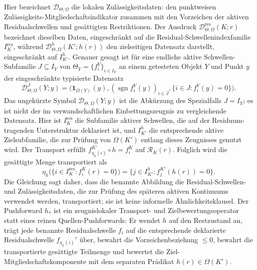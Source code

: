 Hier bezeichnet \(\mathcal{D}_{\Theta,\Omega}\) die lokalen Zulässigkeitsdaten: den punktweisen
Zulässigkeits-Mitgliedschaftsindikator zusammen mit den Vorzeichen der aktiven Residualschwellen und
gesättigten Restriktionen. Der Ausdruck
\(\mathcal{D}^{\mathrm{res}}_{\Theta,\Omega}(K;r)\) bezeichnet dieselben Daten, eingeschränkt auf die
Residual-Schwellenindexfamilie \(I_K^{\mathrm{res}}\), während
\(\mathcal{D}^{h}_{\Theta,\Omega}(K';h(r))\) den zielseitigen Datensatz darstellt, eingeschränkt auf
\(I_{K'}^{h}\). Genauer gesagt ist für eine endliche aktive Schwellen-Subfamilie
\(J\subseteq I_Y\) von
\(\Theta_Y=\{f_i^Y\}_{i\in I_Y}\) an einem getesteten Objekt \(Y\) und Punkt \(y\) der eingeschränkte
typisierte Datensatz
\[
  \mathcal{D}^{J}_{\Theta,\Omega}(Y;y)=
  \big(
    \mathbf{1}_{\Omega(Y)}(y),
    (\operatorname{sgn} f_i^Y(y))_{i\in J},
    \{i\in J:f_i^Y(y)=0\}
  \big).
\]
Das ungekürzte Symbol \(\mathcal{D}_{\Theta,\Omega}(Y;y)\) ist die Abkürzung des Spezialfalls
\(J=I_Y\); es ist nicht der im verwandschaftlichen Einbettungszeugnis zu vergleichende Datensatz.
Hier ist \(I_K^{\mathrm{res}}\) die Subfamilie aktiver Schwellen, die auf der Residuum-tragenden
Unterstruktur deklariert ist, und \(I_{K'}^{h}\) die entsprechende aktive Zielsubfamilie, die zur Prüfung von
\(\Omega(K')\) entlang dieses Zeugnisses genutzt wird. Der Transport erfüllt
\(f_{\eta_h(i)}^{K'}\circ h=f_i^K\) auf \(\mathcal{R}_K(r)\).
Folglich wird die gesättigte Menge transportiert als
\[
  \eta_h\bigl(\{i\in I_K^{\mathrm{res}}:f_i^K(r)=0\}\bigr)
  =
  \{j\in I_{K'}^{h}:f_j^{K'}(h(r))=0\}.
\]
Die Gleichung sagt daher, dass die benannte Abbildung die Residual-Schwellen- und Zulässigkeitsdaten,
die zur Prüfung des späteren aktiven Kontinuums verwendet werden, transportiert; sie ist keine informelle
Ähnlichkeitsklausel. Der Pushforward \(h_{\ast}\) ist ein zeugnislokaler Transport- und Zielbewertungsoperator
statt eines reinen Quellen-Pushforwards: Er wendet \(h\) auf den Restzustand an, trägt jede benannte
Residualschwelle \(f_i\) auf die entsprechende deklarierte Residualschwelle \(f_{\eta_h(i)}'\) über, bewahrt
die Vorzeichenbeziehung \(\le 0\), bewahrt die transportierte gesättigte Teilmenge und bewertet die
Ziel-Mitgliedschaftskomponente mit dem separaten Prädikat
\(h(r)\in\Omega(K')\).


